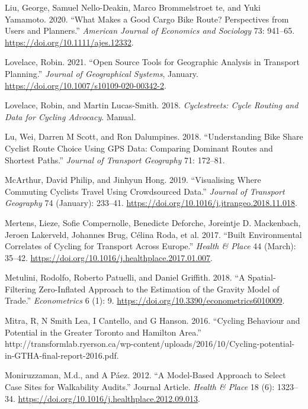 \documentclass[smallextended]{svjour3}       %
\begin{document}
\leavevmode\hypertarget{ref-liuWhatMakesGood2020}{}%
Liu, George, Samuel Nello-Deakin, Marco Brommelstroet te, and Yuki
Yamamoto. 2020. ``What Makes a Good Cargo Bike Route? Perspectives from
Users and Planners.'' \emph{American Journal of Economics and Sociology}
73: 941--65. \url{https://doi.org/10.1111/ajes.12332}.

\leavevmode\hypertarget{ref-lovelaceOpenSourceTools2021}{}%
Lovelace, Robin. 2021. ``Open Source Tools for Geographic Analysis in
Transport Planning.'' \emph{Journal of Geographical Systems}, January.
\url{https://doi.org/10.1007/s10109-020-00342-2}.

\leavevmode\hypertarget{ref-Lovelace2018}{}%
Lovelace, Robin, and Martin Lucas-Smith. 2018. \emph{Cyclestreets: Cycle
Routing and Data for Cycling Advocacy}. Manual.

\leavevmode\hypertarget{ref-Lu2018understanding}{}%
Lu, Wei, Darren M Scott, and Ron Dalumpines. 2018. ``Understanding Bike
Share Cyclist Route Choice Using GPS Data: Comparing Dominant Routes and
Shortest Paths.'' \emph{Journal of Transport Geography} 71: 172--81.

\leavevmode\hypertarget{ref-McArthur2019}{}%
McArthur, David Philip, and Jinhyun Hong. 2019. ``Visualising Where
Commuting Cyclists Travel Using Crowdsourced Data.'' \emph{Journal of
Transport Geography} 74 (January): 233--41.
\url{https://doi.org/10.1016/j.jtrangeo.2018.11.018}.

\leavevmode\hypertarget{ref-Mertens2017}{}%
Mertens, Lieze, Sofie Compernolle, Benedicte Deforche, Joreintje D.
Mackenbach, Jeroen Lakerveld, Johannes Brug, Célina Roda, et al. 2017.
``Built Environmental Correlates of Cycling for Transport Across
Europe.'' \emph{Health \& Place} 44 (March): 35--42.
\url{https://doi.org/10.1016/j.healthplace.2017.01.007}.

\leavevmode\hypertarget{ref-Metulini2018}{}%
Metulini, Rodolfo, Roberto Patuelli, and Daniel Griffith. 2018. ``A
Spatial-Filtering Zero-Inflated Approach to the Estimation of the
Gravity Model of Trade.'' \emph{Econometrics} 6 (1): 9.
\url{https://doi.org/10.3390/econometrics6010009}.

\leavevmode\hypertarget{ref-Mitra2016}{}%
Mitra, R, N Smith Lea, I Cantello, and G Hanson. 2016. ``Cycling
Behaviour and Potential in the Greater Toronto and Hamilton Area.''
http://transformlab.ryerson.ca/wp-content/uploads/2016/10/Cycling-potential-in-GTHA-final-report-2016.pdf.

\leavevmode\hypertarget{ref-Moniruzzaman2012}{}%
Moniruzzaman, M.d., and A Páez. 2012. ``A Model-Based Approach to Select
Case Sites for Walkability Audits.'' Journal Article. \emph{Health \&
Place} 18 (6): 1323--34.
\url{https://doi.org/10.1016/j.healthplace.2012.09.013}.
\end{document}
